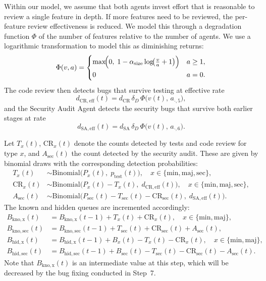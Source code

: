 \documentclass[smallextended]{svjour3}       %
\begin{document}
Within our model, we assume that both agents invest effort that is reasonable to review a single feature in depth. If more features need to be reviewed, the per-feature review effectiveness is reduced. We model this through a degradation function $\Phi$ of the number of features relative to the number of agents. We use a logarithmic transformation to model this as diminishing returns:
\begin{equation}
  \Phi(v, a) =
  \begin{cases}
    \max\!\Bigl(0,\; 1 - \alpha_\mathrm{size}\log\!\bigl(\tfrac{v}{a} + 1\bigr)\Bigr) & a \geq 1,\\[4pt]
    0 & a = 0.
  \end{cases}
  \label{eq:volume_factor}
\end{equation}
The code review then detects bugs that survive testing at effective rate
\begin{equation}
  d_\mathrm{CR,eff}(t) = d_\mathrm{CR}\,\delta_D\,\Phi\bigl(v(t),\, a_{\cdot,5}\bigr),
  \label{eq:dcr_eff}
\end{equation}
and the Security Audit Agent detects the security bugs that survive both earlier stages at rate
\begin{equation}
  d_\mathrm{SA,eff}(t) = d_\mathrm{SA}\,\delta_D\,\Phi\bigl(v(t),\, a_{\cdot,6}\bigr).
  \label{eq:dsa_eff}
\end{equation}

Let $T_x(t)$, $\mathrm{CR}_x(t)$ denote the counts detected by tests and code review for type
$x$, and $A_\mathrm{sec}(t)$ the count detected by the security audit. These are given by binomial draws with the corresponding detection probabilities:
\begin{align}
  T_x(t)        &\sim \mathrm{Binomial}\!\bigl(P_x(t),\; p_\mathrm{test}(t)\bigr),
    \quad x \in \{\mathrm{min,maj,sec}\}, \nonumber \\
  \mathrm{CR}_x(t)  &\sim \mathrm{Binomial}\!\bigl(P_x(t)-T_x(t),\; d_\mathrm{CR,eff}(t)\bigr),
    \quad x \in \{\mathrm{min,maj,sec}\}, \nonumber \\
  A_\mathrm{sec}(t) &\sim \mathrm{Binomial}\!\bigl(P_\mathrm{sec}(t)-T_\mathrm{sec}(t)-\mathrm{CR}_\mathrm{sec}(t),\; d_\mathrm{SA,eff}(t)\bigr).
    \nonumber
\end{align}
The known and hidden queues are incremented accordingly:
\begin{align}
  B_\mathrm{kno,x}(t)   &= B_\mathrm{kno,x}(t-1) + T_x(t) + \mathrm{CR}_x(t),
    \quad x \in \{\mathrm{min,maj}\}, \label{eq:bkno_update} \\
  B_\mathrm{kno,sec}(t) &= B_\mathrm{kno,sec}(t-1) + T_\mathrm{sec}(t) + \mathrm{CR}_\mathrm{sec}(t) + A_\mathrm{sec}(t),
    \nonumber \\
  B_\mathrm{hid,x}(t)   &= B_\mathrm{hid,x}(t-1) + B_x(t) - T_x(t) - \mathrm{CR}_x(t),
    \quad x \in \{\mathrm{min,maj}\}, \nonumber \\
  B_\mathrm{hid,sec}(t) &= B_\mathrm{hid,sec}(t-1) + B_\mathrm{sec}(t) - T_\mathrm{sec}(t) - \mathrm{CR}_\mathrm{sec}(t) - A_\mathrm{sec}(t).
    \nonumber
\end{align}
Note that $B_\mathrm{kno,x}(t)$ is an intermediate value at this step, which will be decreased by the bug fixing conducted in Step~7. 
\end{document}
